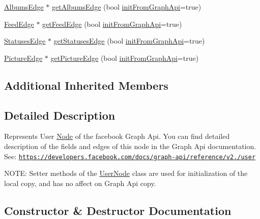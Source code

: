 \begin{DoxyCompactItemize}
\item 
\hyperlink{classfl4cpp_1_1_albums_edge}{Albums\+Edge} $\ast$ \hyperlink{classfl4cpp_1_1_user_node_a08a539f53b74f84ef1651c23dea6463f}{get\+Albums\+Edge} (bool \hyperlink{classfl4cpp_1_1_node_a1dd4594ffd7eb08e9e8c5031d2109a59}{init\+From\+Graph\+Api}=true)
\item 
\hyperlink{classfl4cpp_1_1_feed_edge}{Feed\+Edge} $\ast$ \hyperlink{classfl4cpp_1_1_user_node_a7cd059433ecac7380864287c00eeb563}{get\+Feed\+Edge} (bool \hyperlink{classfl4cpp_1_1_node_a1dd4594ffd7eb08e9e8c5031d2109a59}{init\+From\+Graph\+Api}=true)
\item 
\hyperlink{classfl4cpp_1_1_statuses_edge}{Statuses\+Edge} $\ast$ \hyperlink{classfl4cpp_1_1_user_node_ab17def73da1a8e434b0bddd5cba7b8b5}{get\+Statuses\+Edge} (bool \hyperlink{classfl4cpp_1_1_node_a1dd4594ffd7eb08e9e8c5031d2109a59}{init\+From\+Graph\+Api}=true)
\item 
\hyperlink{classfl4cpp_1_1_picture_edge}{Picture\+Edge} $\ast$ \hyperlink{classfl4cpp_1_1_user_node_ad8b3be23a7e7e749ac6b656bca0b807c}{get\+Picture\+Edge} (bool \hyperlink{classfl4cpp_1_1_node_a1dd4594ffd7eb08e9e8c5031d2109a59}{init\+From\+Graph\+Api}=true)
\end{DoxyCompactItemize}
\subsection*{Additional Inherited Members}


\subsection{Detailed Description}
Represents User \hyperlink{classfl4cpp_1_1_node}{Node} of the facebook Graph Api. You can find detailed description of the fields and edges of this node in the Graph Api documentation. See\+: \href{https://developers.facebook.com/docs/graph-api/reference/v2.0/user}{\tt https\+://developers.\+facebook.\+com/docs/graph-\/api/reference/v2./user}

N\+O\+TE\+: Setter methods of the \hyperlink{classfl4cpp_1_1_user_node}{User\+Node} class are used for initialization of the local copy, and has no affect on Graph Api copy. 

\subsection{Constructor \& Destructor Documentation}
